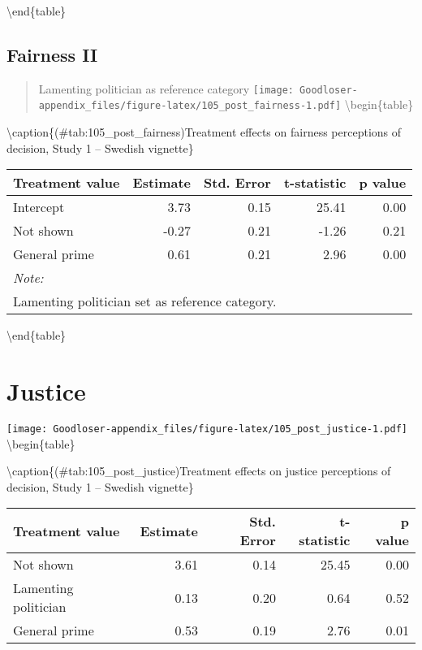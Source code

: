 \documentclass[
]{book}
\begin{document}
\textbackslash end\{table\}

\hypertarget{fairness-ii}{%
\subsection{Fairness II}\label{fairness-ii}}

\begin{quote}
Lamenting politician as reference category
\texttt{[image: Goodloser-appendix\_files/figure-latex/105\_post\_fairness-1.pdf]} \textbackslash begin\{table\}
\end{quote}

\textbackslash caption\{(\#tab:105\_post\_fairness)Treatment effects on fairness perceptions of decision, Study 1 -- Swedish vignette\}
\centering

\begin{tabular}[t]{lrrrr}
\toprule
Treatment value & Estimate & Std. Error & t-statistic & p value\\
\midrule
Intercept & 3.73 & 0.15 & 25.41 & 0.00\\
Not shown & -0.27 & 0.21 & -1.26 & 0.21\\
General prime & 0.61 & 0.21 & 2.96 & 0.00\\
\bottomrule
\multicolumn{5}{l}{\textit{Note: }}\\
\multicolumn{5}{l}{Lamenting politician set as reference category.}\\
\end{tabular}

\textbackslash end\{table\}

\hypertarget{justice}{%
\section{Justice}\label{justice}}

\texttt{[image: Goodloser-appendix\_files/figure-latex/105\_post\_justice-1.pdf]} \textbackslash begin\{table\}

\textbackslash caption\{(\#tab:105\_post\_justice)Treatment effects on justice perceptions of decision, Study 1 -- Swedish vignette\}
\centering

\begin{tabular}[t]{lrrrr}
\toprule
Treatment value & Estimate & Std. Error & t-statistic & p value\\
\midrule
Not shown & 3.61 & 0.14 & 25.45 & 0.00\\
Lamenting politician & 0.13 & 0.20 & 0.64 & 0.52\\
General prime & 0.53 & 0.19 & 2.76 & 0.01\\
\bottomrule
\end{tabular}
\end{document}
